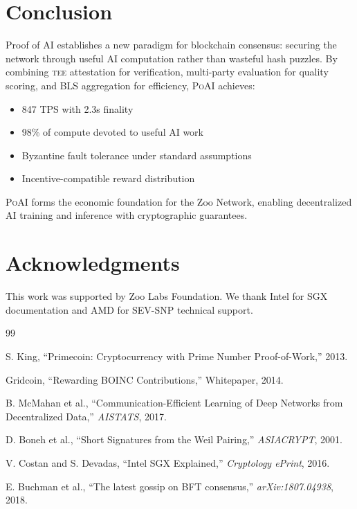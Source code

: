\documentclass[11pt,letterpaper]{article}
\newcommand{\PoAI}{\textsc{PoAI}}
\newcommand{\TEE}{\textsc{tee}}
\begin{document}
\section{Conclusion}

Proof of AI establishes a new paradigm for blockchain consensus: securing the network through useful AI computation rather than wasteful hash puzzles. By combining \TEE{} attestation for verification, multi-party evaluation for quality scoring, and BLS aggregation for efficiency, \PoAI{} achieves:

\begin{itemize}
    \item 847 TPS with 2.3s finality
    \item 98\% of compute devoted to useful AI work
    \item Byzantine fault tolerance under standard assumptions
    \item Incentive-compatible reward distribution
\end{itemize}

\PoAI{} forms the economic foundation for the Zoo Network, enabling decentralized AI training and inference with cryptographic guarantees.

\section*{Acknowledgments}

This work was supported by Zoo Labs Foundation. We thank Intel for SGX documentation and AMD for SEV-SNP technical support.


\begin{thebibliography}{99}

S. King, ``Primecoin: Cryptocurrency with Prime Number Proof-of-Work,'' 2013.

Gridcoin, ``Rewarding BOINC Contributions,'' Whitepaper, 2014.

B. McMahan et al., ``Communication-Efficient Learning of Deep Networks from Decentralized Data,'' \textit{AISTATS}, 2017.

D. Boneh et al., ``Short Signatures from the Weil Pairing,'' \textit{ASIACRYPT}, 2001.

V. Costan and S. Devadas, ``Intel SGX Explained,'' \textit{Cryptology ePrint}, 2016.

E. Buchman et al., ``The latest gossip on BFT consensus,'' \textit{arXiv:1807.04938}, 2018.

\end{thebibliography}
\end{document}
